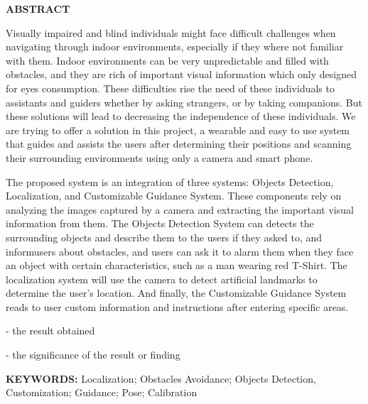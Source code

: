 

\newpage
\thispagestyle{plain}
\setcounter{page}{1}
\renewcommand{\thepage}{\roman{page}}

\begin{center}
    \Large\textbf{ABSTRACT}
\end{center}
\vspace{6pt}

Visually impaired and blind individuals might face difficult challenges when navigating through indoor environments, especially if they where not familiar with them. Indoor environments can be very unpredictable and filled with obstacles, and they are rich of important visual information which only designed for eyes consumption. These difficulties rise the need of these individuals to assistants and guiders whether by asking strangers, or by taking companions. But
these solutions will lead to decreasing the independence of these individuals. We are trying to offer a solution in this project, a wearable and easy to use system that guides and assists the users after determining their positions and scanning their surrounding environments using only a camera and smart phone. 

The proposed system is an integration of three systems: Objects Detection, Localization, and Customizable Guidance System. These components rely on analyzing the images captured by a camera and extracting the important visual information from them. The Objects Detection System can detects the surrounding objects and describe them to the users if they asked to, and informusers about obstacles, and users can ask it to alarm them when they face an object with certain characteristics, such as a man wearing red T-Shirt. The localization system will use the camera to detect artificial landmarks to determine the user’s location. And finally, the Customizable Guidance System reads to user custom information and instructions after entering specific areas.

\color{red}
- the result obtained

- the significance of the result or finding 
\color{black}

\vspace{18pt}
\noindent
\textbf{KEYWORDS:}  Localization; Obstacles Avoidance; Objects Detection, Customization; Guidance; Pose; Calibration
\vspace{3\baselineskip}